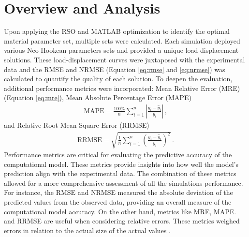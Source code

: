 \section{Overview and Analysis}
Upon applying the RSO and MATLAB optimization to identify the optimal material parameter set, 
multiple sets were calculated. 
Each simulation deployed various Neo-Hookean parameters sets and 
provided a unique load-displacement solutions. These load-displacement curves were 
juxtaposed with the experimental data and the RMSE and NRMSE (Equation \ref{eq:rmse} and \ref{eq:nrmse}) was calculated to quantify the quality 
of each solution. To deepen the evaluation, additional performance metrics were incorporated: 
Mean Relative Error (MRE) (Equation \ref{eq:mre}), Mean Absolute Percentage Error (MAPE)
\begin{align}
    \text{MAPE} = \frac{100\%}{n} \sum_{i=1}^{n} \left| \frac{y_i - \hat{y}_i}{y_i} \right| \,,
\end{align}
and  Relative Root Mean Square Error (RRMSE)  
\begin{align}
    \text{RRMSE} = \sqrt{\frac{1}{n} \sum_{i=1}^{n} \left( \frac{y_i - \hat{y}_i}{y_i} \right)^2} \,.
\end{align}
Performance metrics are critical for evaluating the predictive accuracy of the computational model.
These metrics provide insights into how well the model's prediction align with the 
experimental data. The combination of these metrics allowed for a more comprehensive 
assessment of all the simulations performance. For instance, the RMSE and NRMSE measured the
absolute deviation of the predicted values from the observed data, providing an overall 
measure of the computational model accuracy. On the other hand, metrics like MRE, MAPE. and 
RRMSE are useful when considering relative errors. These metrics weighed errors in relation
to the actual size of the actual values \cite{Rajagukguk2020}.\\

